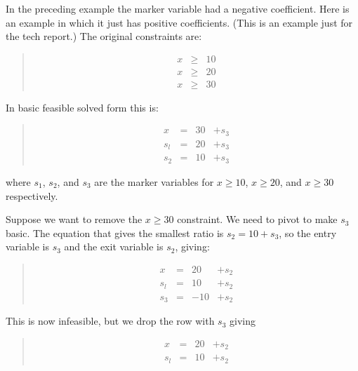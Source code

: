 \documentclass{article}
\begin{document}
In the preceding example the marker variable had a negative coefficient.
Here is an example in which it just has positive coefficients.  (This is an
example just for the tech report.)  The original constraints are:

\begin{quote}\vspace*{-1ex}
$$
\begin{array}{rlrrr} 
x & \geq & 10   \\
x & \geq & 20   \\
x & \geq & 30 
\end{array}
$$
\end{quote}\vspace{-0.9ex}

In basic feasible solved form this is:

\begin{quote}\vspace*{-1ex}
$$
\begin{array}{rlrrr} 
x & = & 30 & + s_3   \\ \hline
s_l & = & 20 & + s_3 \\
s_2 & = & 10 & + s_3 
\end{array}
$$
\end{quote}\vspace{-0.9ex}

where $s_1$, $s_2$, and $s_3$ are the marker variables for 
$x \geq 10$, $x \geq 20$, and $x \geq 30$ respectively.

Suppose we want to remove the $x \geq 30$ constraint.  We need to pivot to
make $s_3$ basic.  The equation that gives the smallest ratio is 
$s_2  = 10  + s_3$, so the entry variable is $s_3$ and the exit variable is
$s_2$, giving:

\begin{quote}\vspace*{-1ex}
$$
\begin{array}{rlrrr} 
x & = & 20 & + s_2   \\ \hline
s_l & = & 10 & + s_2 \\
s_3 & = & -10 & + s_2 
\end{array}
$$
\end{quote}\vspace{-0.9ex}

This is now infeasible, but we drop the row with $s_3$ giving 

\begin{quote}\vspace*{-1ex}
$$
\begin{array}{rlrrr} 
x & = & 20 & + s_2   \\ \hline
s_l & = & 10 & + s_2 
\end{array}
$$
\end{quote}\vspace{-0.9ex}
\end{document}
